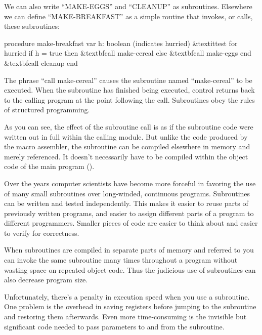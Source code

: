 
We can also write {}``MAKE-EGGS'' and {}``CLEANUP'' as subroutines.
Elsewhere we can define {}``MAKE-BREAKFAST'' as a simple routine
that invokes, or calls, these subroutines:

\begin{Code}[fontfamily=cmss,commandchars=\&\{\}]
procedure make-breakfast
   var h: boolean (indicates hurried)
   &textit{test for hurried}
   if h = true then
      &textbf{call make-cereal}
   else
      &textbf{call make-eggs}
   end
   &textbf{call cleanup}
end
\end{Code}


\medskip

The phrase {}``call make-cereal'' causes the subroutine named {}``make-cereal''
to be executed. When the subroutine has finished being executed, control
returns back to the calling program at the point following the call.
Subroutines obey the rules of structured programming.

As you can see, the effect of the subroutine call is as if the subroutine
code were written out in full within the calling module. But unlike
the code produced by the macro assembler, the subroutine can be compiled
elsewhere in memory and merely referenced. It doesn't necessarily
have to be compiled within the object code of the main program ().


Over the years computer scientists have become more forceful in favoring
the use of many small subroutines over long-winded, continuous programs.
Subroutines can be written and tested independently. This makes it
easier to reuse parts of previously written programs, and easier to
assign different parts of a program to different programmers. Smaller
pieces of code are easier to think about and easier to verify for
correctness.

When subroutines are compiled in separate parts of memory and referred
to you can invoke the same subroutine many times throughout a program
without wasting space on repeated object code. Thus the judicious
use of subroutines can also decrease program size. 

Unfortunately, there's a penalty in execution speed when you use a
subroutine. One problem is the overhead in saving registers before
jumping to the subroutine and restoring them afterwards. Even more
time-consuming is the invisible but significant code needed to pass
parameters to and from the subroutine.

